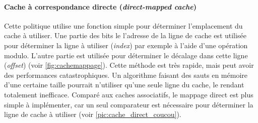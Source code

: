        
        

        \paragraph{Cache à correspondance directe (\textit{direct-mapped cache})} 
            
            Cette politique utilise une fonction simple pour déterminer l'emplacement du cache à utiliser. Une partie des bits le l'adresse de la ligne de cache est utilisée pour déterminer la ligne à utiliser (\textit{index}) par exemple à l'aide d'une opération modulo. L'autre partie est utilisée pour déterminer le décalage dans cette ligne (\textit{offset}) (voir  \autoref{fig:cachemappage}). Cette méthode est très rapide, mais peut avoir des performances catastrophiques. Un algorithme faisant des sauts en mémoire d'une certaine taille pourrait n'utiliser qu'une seule ligne du cache, le rendant totalement inefficace. Comparé aux caches associatifs, le mappage direct est plus simple à implémenter, car un seul comparateur est nécessaire pour déterminer la ligne de cache à utiliser (voir \autoref{pic:cache_direct_coucou}).
 
